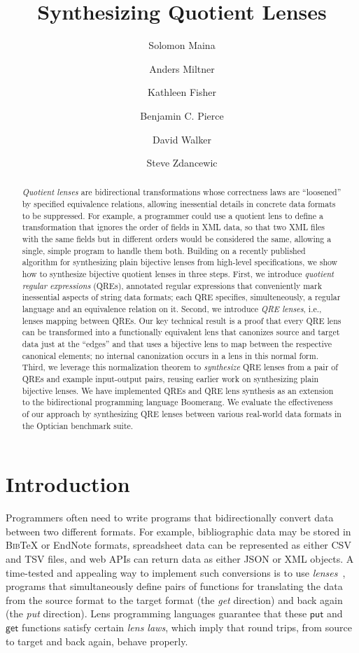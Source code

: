\documentclass[acmsmall,screen]{acmart}
\author{Solomon Maina}
\affiliation{
  \institution{University of Pennsylvnia}
  \country{USA}
}
\author{Anders Miltner}
\affiliation{
  \institution{Princeton University}
  \country{USA}
}
\author{Kathleen Fisher}
\affiliation{
  \institution{Tufts University}
  \country{USA}
}
\author{Benjamin C. Pierce}
\affiliation{
  \institution{University of Pennsylvania}
  \country{USA}
}
\author{David Walker}
\affiliation{
  \institution{Princeton University}
  \country{USA}
}
\author{Steve Zdancewic}
\affiliation{
  \institution{University of Pennsylvania}
  \country{USA}
}
\newcommand{\kw}[1]{\textcolor{dkblue}{\ensuremath{\mathsf{#1}}}}
\newcommand{\bibtex}{\textsc{Bib}\TeX{}}
\begin{document}
\title{Synthesizing Quotient Lenses}
\begin{abstract}
{\em Quotient lenses} are bidirectional transformations whose correctness
laws are ``loosened'' by specified equivalence relations, allowing
inessential details in concrete data formats to be suppressed. 
For example, a programmer could use a quotient lens to define 
a transformation that ignores the order of fields in XML data, so
that two XML files with the same fields but in different orders would be
considered the same, allowing a single, simple program to handle them both. 
%
Building on a recently published algorithm for synthesizing plain bijective
lenses from high-level specifications, we show how to synthesize bijective
quotient lenses in three steps. First, we introduce {\em quotient regular
  expressions} (QREs), annotated regular expressions that conveniently mark
inessential aspects of string data formats; each QRE specifies,
simulteneously, a regular language and an equivalence relation on it.
Second, we introduce {\em QRE lenses}, i.e., lenses mapping between QREs.
Our key technical result is a proof that every QRE lens can be transformed
into a functionally equivalent lens that canonizes source and target data just
at the ``edges'' and that uses a bijective lens to map between the respective
canonical elements; no internal canonization occurs in a lens in this normal
form. Third, we leverage this normalization theorem to {\em synthesize} QRE
lenses from a pair of QREs and example input-output pairs, reusing earlier work
on synthesizing plain bijective lenses. We have implemented QREs and QRE lens
synthesis as an extension to the bidirectional programming language Boomerang.
We evaluate the effectiveness of our approach by synthesizing QRE lenses
between various real-world data formats in the Optician benchmark suite.
\end{abstract}

\maketitle
\renewcommand{\shortauthors}{S. Maina, A. Miltner, K. Fisher, B. C. Pierce, D. Walker, S. Zdancewic}
\section{Introduction}
Programmers often need to write programs that bidirectionally convert data
between two different formats. For example, bibliographic data may be stored in
\bibtex{} or EndNote formats, spreadsheet data can be represented as either CSV
and TSV files, and web APIs can return data as either JSON or XML objects.  A
time-tested and appealing way to implement such conversions is to use
\emph{lenses}~\cite{Lenses}, programs that simultaneously define pairs of
functions for translating the data from the source format to the target format
(the \emph{get} direction) and back again (the \emph{put} direction).  Lens
programming languages guarantee that these \kw{put} and \kw{get} functions
satisfy certain \emph{lens laws}, which imply that round trips, from source to
target and back again, behave properly.
\end{document}
